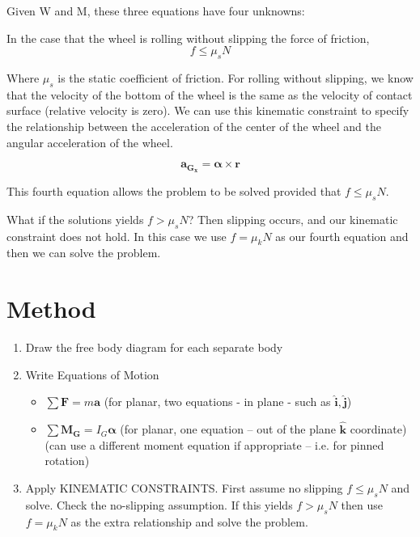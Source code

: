 \documentclass[12pt,letterpaper,twoside]{report}
\begin{document}
Given W and M, these three equations have four unknowns:
\vspace*{6\baselineskip}

In the case that the wheel is rolling without slipping the force of friction, 
\[
f \leq \mu_s N
\]

Where $ \mu_s$ is the static coefficient of friction.  For rolling without slipping, we know that the velocity of the bottom of the wheel is the same as the velocity of contact surface (relative velocity is zero).  We can use this kinematic constraint to specify the relationship between the acceleration of the center of the wheel and the angular acceleration of the wheel.  

\[
\bm{a_{G_x}} = \bm{\alpha} \times \bm{r}
\]

This fourth equation allows the problem to be solved provided that $f \leq \mu_s N$. 

\vspace*{11\baselineskip}

What if the solutions yields $f > \mu_s N$? Then slipping occurs, and our kinematic constraint does not hold.  In this case we use $f = \mu_k N$ as our fourth equation and then we can solve the problem.  
 
\vspace*{5\baselineskip} 
 
\section{Method}
\begin{enumerate}
\item Draw the free body diagram for each separate body
\item  Write Equations of Motion 
\begin{itemize}
\item $\displaystyle \sum \bm{F} = m \bm{a}$ (for planar, two equations - in plane - such as $\bm{\hat{i}}, \bm{\hat{j}}$)
\item $\displaystyle \sum \bm{M_G} = I_G \bm{\alpha}$ (for planar, one equation – out of the plane $\bm{\hat{k}}$ coordinate) \\
(can use a different moment equation if appropriate – i.e. for pinned rotation)
\end{itemize}
\item Apply KINEMATIC CONSTRAINTS. First assume no slipping $f \leq \mu_s N$ and solve. Check the no-slipping assumption.  If this yields $f > \mu_s N$ then use $f = \mu_k N$ as the extra relationship and solve the problem.
\end{enumerate}
\end{document}

